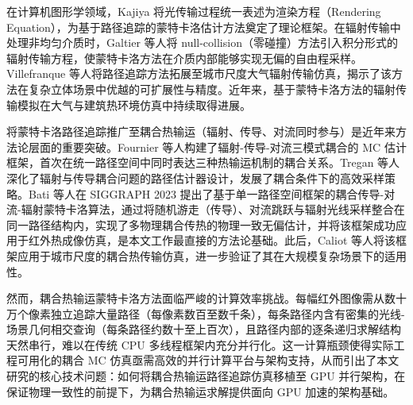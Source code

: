 在计算机图形学领域，Kajiya 将光传输过程统一表述为渲染方程（Rendering Equation），为基于路径追踪的蒙特卡洛估计方法奠定了理论框架\cite{kajiyaRenderingEquation1986}。在辐射传输中处理非均匀介质时，Galtier 等人将 null-collision（零碰撞）方法引入积分形式的辐射传输方程，使蒙特卡洛方法在介质内部能够实现无偏的自由程采样\cite{galtierIntegralFormulationNullcollision2013}。Villefranque 等人将路径追踪方法拓展至城市尺度大气辐射传输仿真，揭示了该方法在复杂立体场景中优越的可扩展性与精度\cite{villefranquePathtracingMonteCarlo2019,villefranqueTeapotCityParadigm2022}。近年来，基于蒙特卡洛方法的辐射传输模拟在大气与建筑热环境仿真中持续取得进展\cite{mourtadayMonteCarloSimulation2024,fanMontecarlobasedSimulationsRadiative2025}。

将蒙特卡洛路径追踪推广至耦合热输运（辐射、传导、对流同时参与）是近年来方法论层面的重要突破。Fournier 等人构建了辐射-传导-对流三模式耦合的 MC 估计框架，首次在统一路径空间中同时表达三种热输运机制的耦合关系\cite{fournierRadiativeConductiveConvective2016}。Tregan 等人深化了辐射与传导耦合问题的路径估计器设计，发展了耦合条件下的高效采样策略\cite{treganCouplingRadiativeConductive2023}。Bati 等人在 SIGGRAPH 2023 提出了基于单一路径空间框架的耦合传导-对流-辐射蒙特卡洛算法，通过将随机游走（传导）、对流跳跃与辐射光线采样整合在同一路径结构内，实现了多物理耦合传热的物理一致无偏估计，并将该框架成功应用于红外热成像仿真，是本文工作最直接的方法论基础\cite{batiCouplingConductionConvection2023}。此后，Caliot 等人将该框架应用于城市尺度的耦合热传输仿真，进一步验证了其在大规模复杂场景下的适用性\cite{caliotCoupledHeatTransfers2024}。

然而，耦合热输运蒙特卡洛方法面临严峻的计算效率挑战。每幅红外图像需从数十万个像素独立追踪大量路径（每像素数百至数千条），每条路径内含有密集的光线-场景几何相交查询（每条路径约数十至上百次），且路径内部的逐条递归求解结构天然串行，难以在传统 CPU 多线程框架内充分并行化。这一计算瓶颈使得实际工程可用化的耦合 MC 仿真亟需高效的并行计算平台与架构支持，从而引出了本文研究的核心技术问题：如何将耦合热输运路径追踪仿真移植至 GPU 并行架构，在保证物理一致性的前提下，为耦合热输运求解提供面向 GPU 加速的架构基础。


